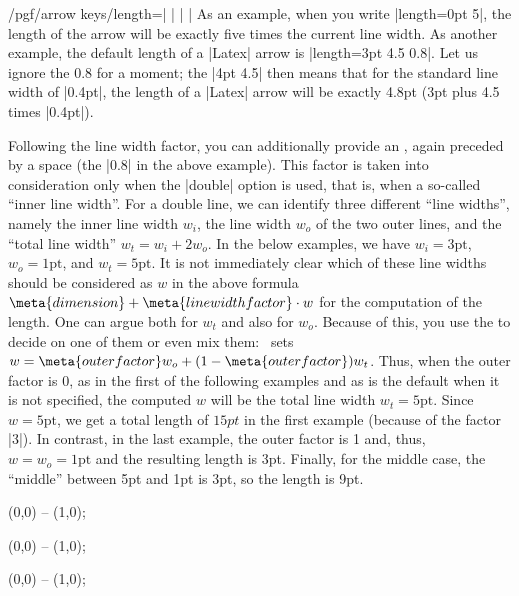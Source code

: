 \begin{key}{/pgf/arrow keys/length=| |%
        | |}
    As an example, when you write |length=0pt 5|, the length of the arrow will
    be exactly five times the current line width. As another example, the
    default length of a |Latex| arrow is |length=3pt 4.5 0.8|. Let us ignore
    the 0.8 for a moment; the |4pt 4.5| then means that for the standard line
    width of |0.4pt|, the length of a |Latex| arrow will be exactly 4.8pt (3pt
    plus 4.5 times |0.4pt|).

    Following the line width factor, you can additionally provide an
    , again preceded by a space (the |0.8| in the above
    example). This factor is taken into consideration only when the |double|
    option is used, that is, when a so-called ``inner line width''. For a
    double line, we can identify three different ``line widths'', namely the
    inner line width $w_i$, the line width  $w_o$ of the two outer lines, and
    the ``total line width'' $w_t = w_i + 2w_o$. In the below examples, we have
    $w_i = 3\mathrm{pt}$, $w_o=1\mathrm{pt}$, and $w_t = 5\mathrm{pt}$. It is
    not immediately clear which of these line widths should be considered as
    $w$ in the above formula $\meta{dimension} + \meta{line width factor}\cdot
    w$ for the computation of the length. One can argue both for $w_t$ and also
    for $w_o$. Because of this, you use the  to decide on
    one of them or even mix them: \tikzname\ sets $w = \meta{outer factor} w_o
    + (1-\meta{outer factor})w_t$. Thus, when the outer factor is $0$, as in
    the first of the following examples and as is the default when it is not
    specified, the computed $w$ will be the total line width $w_t =
    5\mathrm{pt}$. Since $w=5\mathrm{pt}$, we get a total length of $15pt$ in
    the first example (because of the factor |3|). In contrast, in the last
    example, the outer factor is 1 and, thus, $w = w_o = \mathrm{1pt}$ and the
    resulting length is 3pt. Finally, for the middle case, the ``middle''
    between 5pt and 1pt is 3pt, so the length is 9pt.
\begin{codeexample}[]
\tikz \draw [line width=1pt, double distance=3pt,
             arrows = {-Latex[length=0pt 3 0]}] (0,0) -- (1,0);
\end{codeexample}
\begin{codeexample}[]
\tikz \draw [line width=1pt, double distance=3pt,
             arrows = {-Latex[length=0pt 3 .5]}] (0,0) -- (1,0);
\end{codeexample}
\begin{codeexample}[]
\tikz \draw [line width=1pt, double distance=3pt,
             arrows = {-Latex[length=0pt 3 1]} ] (0,0) -- (1,0);
\end{codeexample}


\end{key}
